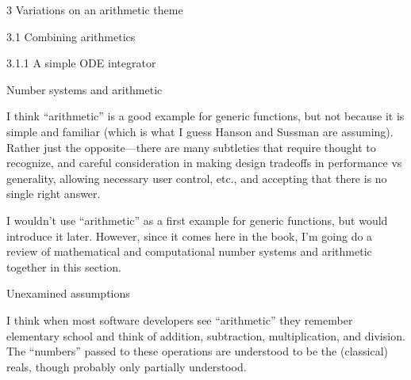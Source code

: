 \documentclass[12pt]{PalisadesLakesBook}
\begin{document}
\begin{plSection}{3 Variations on an arithmetic theme}
\begin{plSection}{3.1 Combining arithmetics}
\begin{plSection}{3.1.1 A simple ODE integrator}
\end{plSection}%
\begin{plSection}{Number systems and arithmetic}

I think ``arithmetic'' is a good example for generic functions,
but not because it is simple and familiar
(which is what I guess Hanson and Sussman are assuming).
Rather just the opposite---there are many subtleties
that require thought to recognize,
and careful consideration in making design tradeoffs
in performance vs generality, allowing necessary user control,
etc.,
and accepting that there is no single right answer.

I wouldn't use ``arithmetic'' as a first example for
generic functions, but would introduce it later.
However, since it comes here in the book,
I'm going do a review of mathematical and computational
number systems and arithmetic together in this section.

\begin{plSection}{Unexamined assumptions}

I think when most software developers see ``arithmetic''
they remember elementary school
and think of addition, subtraction, multiplication, and division.
The ``numbers'' passed to these operations are 
understood to be the (classical) reals, 
though probably only partially understood.


\end{plSection}
\end{plSection}
\end{plSection}
\end{plSection}
\end{document}

